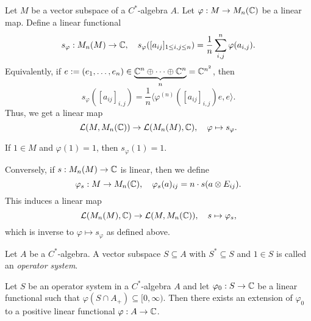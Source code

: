 Let $M$ be a vector subspace of a $C^*$-algebra $A$.
Let $\varphi: M \to M_n (\mathbb {C})$ be a linear map. Define a linear functional 
$$s_{\varphi}: M_n (M) \to \mathbb {C},\quad s_{\varphi} ([a_{ij}]_{1 \leq i, j \leq n}) = \frac{1}{n} \sum_{i, j} ^n \varphi (a_{i, j}).$$
Equivalently, if $e := (e_1, \dots, e_n) \in \underbrace{\mathbb {C}^n \oplus \cdots \oplus \mathbb {C}^n}_{n} = \mathbb {C}^{n^2}$, then 
$$s_{\varphi} ([a_{ij}]_{i, j}) = \frac{1}{n} \langle \varphi^{(n)} ([a_{ij}]_{i, j}) e, e \rangle.$$
Thus, we get a linear map $$\mathcal{L} (M, M_n (\mathbb {C})) \to \mathcal{L} (M_n (M), \mathbb {C}),\quad \varphi \mapsto s_{\varphi}.$$
\begin{remark}
    If $1 \in M$ and $\varphi(1) = 1$, then $s_{\varphi} (1) = 1$.
\end{remark}
Conversely, if $s: M_n (M) \to \mathbb {C}$ is linear, then we define 
$$\varphi_s : M \to M_n (\mathbb {C}),\quad \varphi_s (a) _{ij} = n \cdot s(a \otimes E_{ij}).$$
This induces a linear map 
$$\mathcal{L} (M_n (M), \mathbb {C}) \to \mathcal{L} (M, M_n (\mathbb {C})) ,\quad s \mapsto {\varphi}_s,$$
which is inverse to $\varphi \mapsto s_{\varphi}$ as defined above.

\begin{definition}
    Let $A$ be a $C^*$-algebra. A vector subspace $S \subseteq A$ with $S^* \subseteq S$ and $1 \in S$
    is called an \emph{operator system}.
\end{definition}

\begin{theorem}
    Let $S$ be an operator system in a $C^*$-algebra $A$ and let $\varphi_0: S \to \mathbb {C}$
    be a linear functional such that $\varphi (S \cap A_+) \subseteq [0, \infty)$.
    Then there exists an extension of $\varphi_0$ to a positive linear functional $\varphi: A \to \mathbb {C}$.
\end{theorem}

